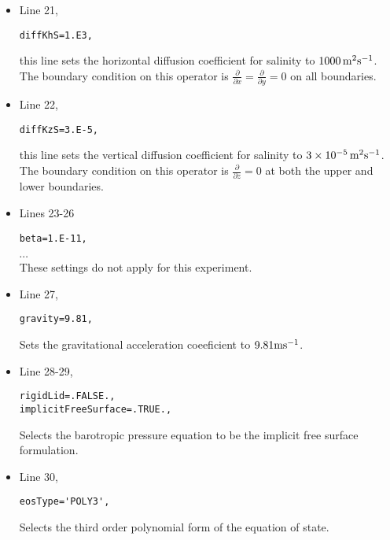 {\begin{itemize}
\item Line 21,
\begin{verbatim}
diffKhS=1.E3,
\end{verbatim}
this line sets the horizontal diffusion coefficient for salinity
to $1000\,{\rm m^{2}s^{-1}}$. The boundary condition on this
operator is $\frac{\partial}{\partial x}=\frac{\partial}{\partial y}=0$ on
all boundaries.

\item Line 22,
\begin{verbatim}
diffKzS=3.E-5,
\end{verbatim}
this line sets the vertical diffusion coefficient for salinity
to $3 \times 10^{-5}\,{\rm m^{2}s^{-1}}$. The boundary 
condition on this operator is $\frac{\partial}{\partial z}=0$ at both
the upper and lower boundaries.

\item Lines 23-26
\begin{verbatim}
beta=1.E-11,
\end{verbatim}
\vspace{-5mm}$\cdots$\\
These settings do not apply for this experiment.

\item Line 27,
\begin{verbatim}
gravity=9.81,
\end{verbatim}
Sets the gravitational acceleration coeeficient to $9.81{\rm m}{\rm s}^{-1}$.\\


\item Line 28-29,
\begin{verbatim}
rigidLid=.FALSE., 
implicitFreeSurface=.TRUE., 
\end{verbatim}
Selects the barotropic pressure equation to be the implicit free surface
formulation.

\item Line 30,
\begin{verbatim}
eosType='POLY3',
\end{verbatim}
Selects the third order polynomial form of the equation of state.\\


\end{itemize}}
